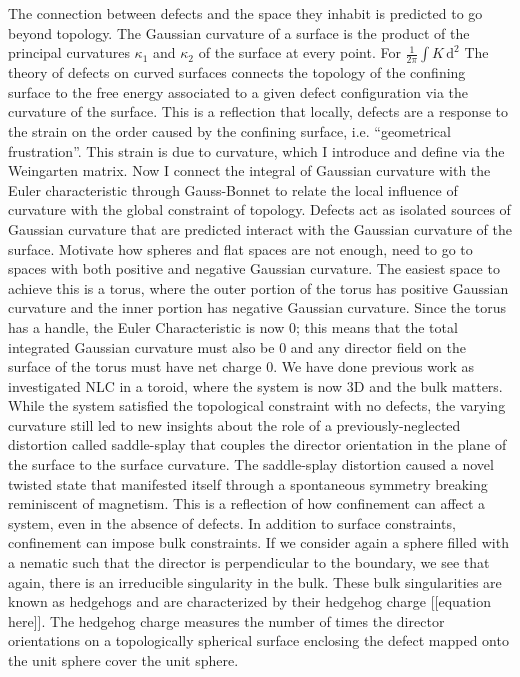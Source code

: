 The connection between defects and the space they inhabit is predicted to go beyond topology.
The Gaussian curvature of a surface is the product of the principal curvatures $\kappa_1$ and $\kappa_2$ of the surface at every point.
For
$
 \frac{1}{2\pi} \int K\, \textrm{d}^2$
The theory of defects on curved surfaces connects the topology of the confining surface to the free energy associated to a given defect configuration via the curvature of the surface.
This is a reflection that locally, defects are a response to the strain on the order caused by the confining surface, i.e. ``geometrical frustration''.
This strain is due to curvature, which I introduce and define via the Weingarten matrix.
Now I connect the integral of Gaussian curvature with the Euler characteristic through Gauss-Bonnet to relate the local influence of curvature with the global constraint of topology.
Defects act as isolated sources of Gaussian curvature that are predicted interact with the Gaussian curvature of the surface.
Motivate how spheres and flat spaces are not enough, need to go to spaces with both positive and negative Gaussian curvature.
The easiest space to achieve this is a torus, where the outer portion of the torus has positive Gaussian curvature and the inner portion has negative Gaussian curvature.
Since the torus has a handle, the Euler Characteristic is now 0; this means that the total integrated Gaussian curvature must also be 0 and any director field on the surface of the torus must have net charge 0.
We have done previous work as investigated NLC in a toroid, where the system is now 3D and the bulk matters.
While the system satisfied the topological constraint with no defects, the varying curvature still led to new insights about the role of a previously-neglected distortion called saddle-splay that couples the director orientation in the plane of the surface to the surface curvature.
The saddle-splay distortion caused a novel twisted state that manifested itself through a spontaneous symmetry breaking reminiscent of magnetism.
This is a reflection of how confinement can affect a system, even in the absence of defects.
In addition to surface constraints, confinement can impose bulk constraints.
If we consider again a sphere filled with a nematic such that the director is perpendicular to the boundary, we see that again, there is an irreducible singularity in the bulk.
These bulk singularities are known as hedgehogs and are characterized by their hedgehog charge [[equation here]].
The hedgehog charge measures the number of times the director orientations on a topologically spherical surface enclosing the defect mapped onto the unit sphere cover the unit sphere.
